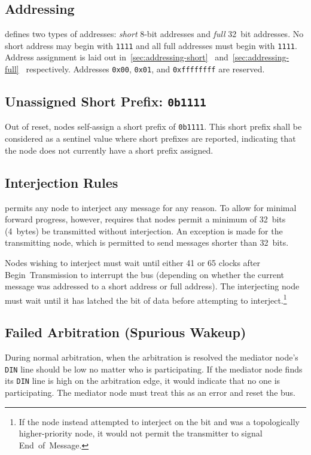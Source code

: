\subsection{Addressing}
\label{sec:spec-address}
\bus defines two types of addresses: \textit{short} 8-bit addresses and
\textit{full} 32~bit addresses. No short address may begin with {\tt 1111} and
all full addresses must begin with {\tt 1111}. Address assignment is laid out
in~\ref{sec:addressing-short}~
and~\ref{sec:addressing-full}~ respectively.
%
Addresses {\tt 0x00}, {\tt 0x01}, and {\tt 0xffffffff} are reserved.

\subsection{Unassigned Short Prefix: \texttt{0b1111}}
\label{sec:spec-unassigned-short-prefix}
Out of reset, nodes self-assign a short prefix of {\tt 0b1111}. This short
prefix shall be considered as a sentinel value where short prefixes are
reported, indicating that the node does not currently have a short prefix
assigned.

\subsection{Interjection Rules}
\label{sec:spec-interjection}
\bus permits any node to interject any message for any reason. To allow for
minimal forward progress, however, \bus requires that nodes permit a minimum
of 32~bits (4~bytes) be transmitted without interjection. An exception is made
for the transmitting node, which is permitted to send messages shorter than
32~bits.

Nodes wishing to interject must wait until either 41 or 65 clocks after
Begin~Transmission to interrupt the bus (depending on whether the current
message was addressed to a short address or full address). The interjecting
node must wait until it has latched the  bit of data before attempting
to interject.\footnote{
  If the node instead attempted to interject on the  bit and was a
  topologically higher-priority node, it would not permit the transmitter to
  signal End~of~Message.}

\subsection{Failed Arbitration (Spurious Wakeup)}
\label{sec:spec-spurious}
During normal arbitration, when the arbitration is resolved the mediator
node's {\tt DIN} line should be low no matter who is participating. If the
mediator node finds its {\tt DIN} line is high on the arbitration edge, it
would indicate that no one is participating. The mediator node must treat this
as an error and reset the bus.

